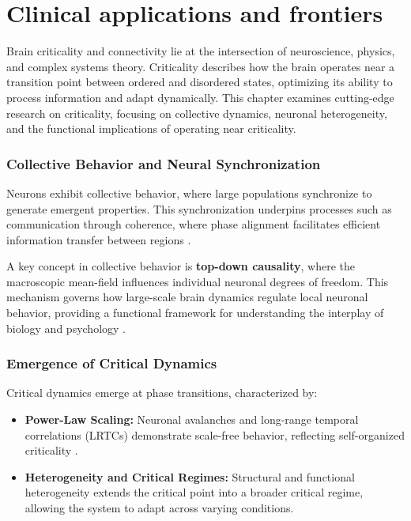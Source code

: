 \section{Clinical applications and frontiers}


Brain criticality and connectivity lie at the intersection of neuroscience, physics, and complex systems theory. Criticality describes how the brain operates near a transition point between ordered and disordered states, optimizing its ability to process information and adapt dynamically. This chapter examines cutting-edge research on criticality, focusing on collective dynamics, neuronal heterogeneity, and the functional implications of operating near criticality.

\subsubsection*{Collective Behavior and Neural Synchronization}

Neurons exhibit collective behavior, where large populations synchronize to generate emergent properties. This synchronization underpins processes such as communication through coherence, where phase alignment facilitates efficient information transfer between regions \cite{beggs2003neuronal}.

A key concept in collective behavior is \textbf{top-down causality}, where the macroscopic mean-field influences individual neuronal degrees of freedom. This mechanism governs how large-scale brain dynamics regulate local neuronal behavior, providing a functional framework for understanding the interplay of biology and psychology \cite{linkenkaer2001scale}.

\subsubsection*{Emergence of Critical Dynamics}

Critical dynamics emerge at phase transitions, characterized by:
\begin{itemize}
    \item \textbf{Power-Law Scaling:} Neuronal avalanches and long-range temporal correlations (LRTCs) demonstrate scale-free behavior, reflecting self-organized criticality \cite{beggs2003neuronal}.
    \item \textbf{Heterogeneity and Critical Regimes:} Structural and functional heterogeneity extends the critical point into a broader critical regime, allowing the system to adapt across varying conditions.
\end{itemize}

